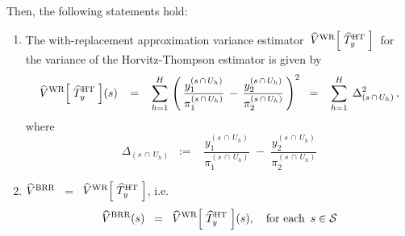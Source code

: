 \begin{proposition}
\begin{itemize}
\begin{equation*}
	\end{equation*}
\end{itemize}
Then, the following statements hold:
\begin{enumerate}
\item
	The with-replacement approximation variance estimator 
	\,$\widehat{V}^{\textnormal{WR}}\!\left[\;\widehat{T}^{\textnormal{HT}}_{y}\;\right]$\,
	for the variance of the Horvitz-Thompson estimator is given by
	\begin{equation*}
	\widehat{V}^{\textnormal{WR}}\!\left[\;\widehat{T}^{\textnormal{HT}}_{y}\;\right]\!(s)
	\;\;\; = \;\;\;
		\overset{H}{\underset{h = 1}{\sum}}\,
		\left(\,
			\dfrac{y^{(s\,\cap\,U_{h})}_{1}}{\pi^{(s\,\cap\,U_{h})}_{1}}
			\,-\,
			\dfrac{y^{(s\,\cap\,U_{h})}_{2}}{\pi^{(s\,\cap\,U_{h})}_{2}}
			\,\right)^{2}
	\;\; = \;\;\;
		\overset{H}{\underset{h=1}{\sum}}\;\, \Delta_{(s\,\cap\,U_{h})}^{2}\,,
	\end{equation*}
	where
	\begin{equation*}
	\Delta_{(s\,\cap\,U_{h})}
	\;\; := \;\;\;
		\dfrac{y^{(s\,\cap\,U_{h})}_{1}}{\pi^{(s\,\cap\,U_{h})}_{1}}
		\; - \;
		\dfrac{y^{(s\,\cap\,U_{h})}_{2}}{\pi^{(s\,\cap\,U_{h})}_{2}}
	\end{equation*}
\item
	$\widehat{V}^{\textnormal{BRR}}$ \,$=$\,
	$\widehat{V}^{\textnormal{WR}}\!\left[\;\widehat{T}^{\textnormal{HT}}_{y}\;\right]$, i.e.
	\begin{equation*}
	\widehat{V}^{\textnormal{BRR}}(s)
	\;\; = \;\;
		\widehat{V}^{\textnormal{WR}}\!\left[\;\widehat{T}^{\textnormal{HT}}_{y}\;\right]\!(s),
	\quad
	\textnormal{for each \,$s \in \mathcal{S}$}
	\end{equation*}
\end{enumerate}
\end{proposition}
\proof
